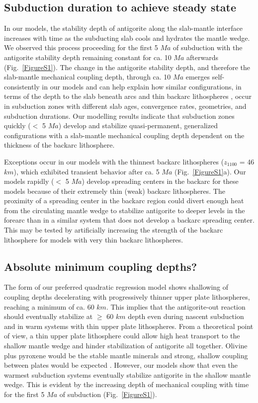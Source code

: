 \documentclass[draft]{assets/agujournal2019}
\begin{document}
\subsection*{Subduction duration to achieve steady state}
In our models, the stability depth of antigorite along the slab-mantle interface increases with time as the subducting slab cools and hydrates the mantle wedge. We observed this process proceeding for the first 5 $Ma$ of subduction with the antigorite stability depth remaining constant for ca. 10 $Ma$ afterwards (Fig.~\ref{FigureS1}). The change in the antigorite stability depth, and therefore the slab-mantle mechanical coupling depth, through ca. 10 $Ma$ emerges self-consistently in our models and can help explain how similar configurations, in terms of the depth to the slab beneath arcs \cite{England2004} and thin backarc lithospheres \cite{Currie2006}, occur in subduction zones with different slab ages, convergence rates, geometries, and subduction durations. Our modelling results indicate that subduction zones quickly ($<$ 5 $Ma$) develop and stabilize quasi-permanent, generalized configurations with a slab-mantle mechanical coupling depth dependent on the thickness of the backarc lithosphere.

Exceptions occur in our models with the thinnest backarc lithospheres ($z_{1100}$ = 46 $km$), which exhibited transient behavior after ca. 5 $Ma$ (Fig.~\ref{FigureS1}a). Our models rapidly ($<$ 5 $Ma$) develop spreading centers in the backarc for these models because of their extremely thin (weak) backarc lithospheres. The proximity of a spreading center in the backarc region could divert enough heat from the circulating mantle wedge to stabilize antigorite to deeper levels in the forearc than in a similar system that does not develop a backarc spreading center. This may be tested by artificially increasing the strength of the backarc lithosphere for models with very thin backarc lithospheres.

\subsection*{Absolute minimum coupling depths?}
The form of our preferred quadratic regression model shows shallowing of coupling depths decelerating with progressively thinner upper plate lithospheres, reaching a minimum of ca. 60 $km$. This implies that the antigorite-out reaction should eventually stabilize at $\geq$ 60 $km$ depth even during nascent subduction and in warm systems with thin upper plate lithospheres. From a theoretical point of view, a thin upper plate lithosphere could allow high heat transport to the shallow mantle wedge and hinder stabilization of antigorite all together. Olivine plus pyroxene would be the stable mantle minerals and strong, shallow coupling between plates would be expected \cite{Gerya2008}. However, our models show that even the warmest subduction systems eventually stabilize antigorite in the shallow mantle wedge. This is evident by the increasing depth of mechanical coupling with time for the first 5 $Ma$ of subduction (Fig.~\ref{FigureS1}).
\end{document}
